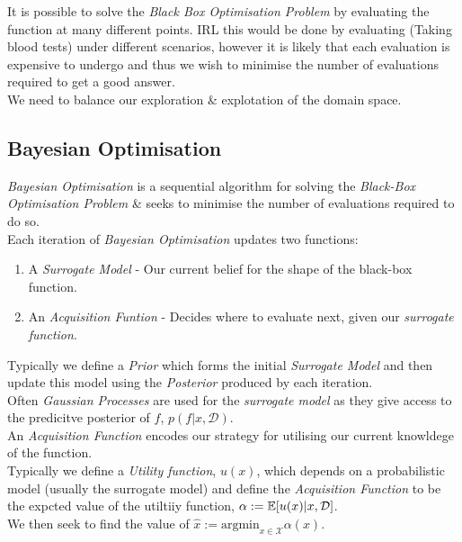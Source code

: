 \documentclass[11pt,a4paper]{article}
\begin{document}
It is possible to solve the \textit{Black Box Optimisation Problem} by evaluating the function at many different points. IRL this would be done by evaluating (\eg Taking blood tests) under different scenarios, however it is likely that each evaluation is expensive to undergo and thus we wish to minimise the number of evaluations required to get a good answer.\\
\nb We need to balance our exploration \& explotation of the domain space.

\subsection{Bayesian Optimisation} %

\textit{Bayesian Optimisation} is a sequential algorithm for solving the \textit{Black-Box Optimisation Problem} \& seeks to minimise the number of evaluations required to do so.\\
Each iteration of \textit{Bayesian Optimisation} updates two functions:
\begin{enumerate}
	\item A \textit{Surrogate Model} - Our current belief for the shape of the black-box function.
	\item An \textit{Acquisition Funtion} - Decides where to evaluate next, given our \textit{surrogate function}.
\end{enumerate}

Typically we define a \textit{Prior} which forms the initial \textit{Surrogate Model} and then update this model using the \textit{Posterior} produced by each iteration.\\
Often \textit{Gaussian Processes} are used for the \textit{surrogate model} as they give access to the predicitve posterior of $f$, $p(f|x,\mathcal{D})$.\\

An \textit{Acquisition Function} encodes our strategy for utilising our current knowldege of the function.\\
Typically we define a \textit{Utility function}, $u(x)$, which depends on a probabilistic model (usually the surrogate model) and define the \textit{Acquisition Function} to be the expcted value of the utiltiiy function, $\alpha:=\mathbb{E}[u(x)|x,\mathcal{D}]$.\\
We then seek to find the value of $\hat{x}:=\text{argmin}_{x\in\mathcal{X}}\alpha(x)$.\\
\end{document}

